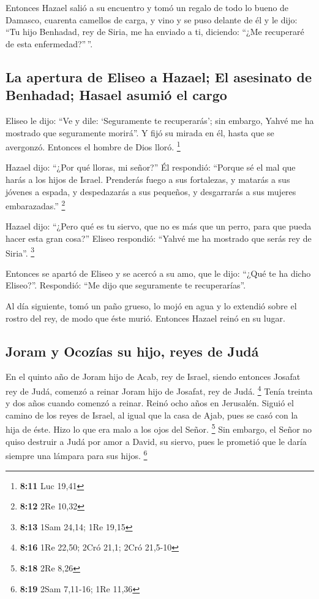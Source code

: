  Entonces Hazael salió a su encuentro y tomó un regalo de
todo lo bueno de Damasco, cuarenta camellos de carga, y vino y se puso
delante de él y le dijo: ``Tu hijo Benhadad, rey de Siria, me ha enviado
a ti, diciendo: ``¿Me recuperaré de esta enfermedad?''\,''.

\hypertarget{la-apertura-de-eliseo-a-hazael-el-asesinato-de-benhadad-hasael-asumiuxf3-el-cargo}{%
\subsection{La apertura de Eliseo a Hazael; El asesinato de Benhadad;
Hasael asumió el
cargo}\label{la-apertura-de-eliseo-a-hazael-el-asesinato-de-benhadad-hasael-asumiuxf3-el-cargo}}

 Eliseo le dijo: ``Ve y dile: `Seguramente te
recuperarás'; sin embargo, Yahvé me ha mostrado que seguramente
morirá''.  Y fijó su mirada en él, hasta que se
avergonzó. Entonces el hombre de Dios lloró. \footnote{\textbf{8:11} Luc
  19,41}

 Hazael dijo: ``¿Por qué lloras, mi señor?'' Él
respondió: ``Porque sé el mal que harás a los hijos de Israel. Prenderás
fuego a sus fortalezas, y matarás a sus jóvenes a espada, y despedazarás
a sus pequeños, y desgarrarás a sus mujeres embarazadas.'' \footnote{\textbf{8:12}
  2Re 10,32}

 Hazael dijo: ``¿Pero qué es tu siervo, que no es más que
un perro, para que pueda hacer esta gran cosa?'' Eliseo respondió:
``Yahvé me ha mostrado que serás rey de Siria''. \footnote{\textbf{8:13}
  1Sam 24,14; 1Re 19,15}

 Entonces se apartó de Eliseo y se acercó a su amo, que
le dijo: ``¿Qué te ha dicho Eliseo?''. Respondió: ``Me dijo que
seguramente te recuperarías''.

 Al día siguiente, tomó un paño grueso, lo mojó en agua y
lo extendió sobre el rostro del rey, de modo que éste murió. Entonces
Hazael reinó en su lugar.

\hypertarget{joram-y-ocozuxedas-su-hijo-reyes-de-juduxe1}{%
\subsection{Joram y Ocozías su hijo, reyes de
Judá}\label{joram-y-ocozuxedas-su-hijo-reyes-de-juduxe1}}

 En el quinto año de Joram hijo de Acab, rey de Israel,
siendo entonces Josafat rey de Judá, comenzó a reinar Joram hijo de
Josafat, rey de Judá. \footnote{\textbf{8:16} 1Re 22,50; 2Cró 21,1; 2Cró
  21,5-10}  Tenía treinta y dos años cuando comenzó a
reinar. Reinó ocho años en Jerusalén.  Siguió el camino
de los reyes de Israel, al igual que la casa de Ajab, pues se casó con
la hija de éste. Hizo lo que era malo a los ojos del Señor. \footnote{\textbf{8:18}
  2Re 8,26}  Sin embargo, el Señor no quiso destruir a
Judá por amor a David, su siervo, pues le prometió que le daría siempre
una lámpara para sus hijos. \footnote{\textbf{8:19} 2Sam 7,11-16; 1Re
  11,36}

